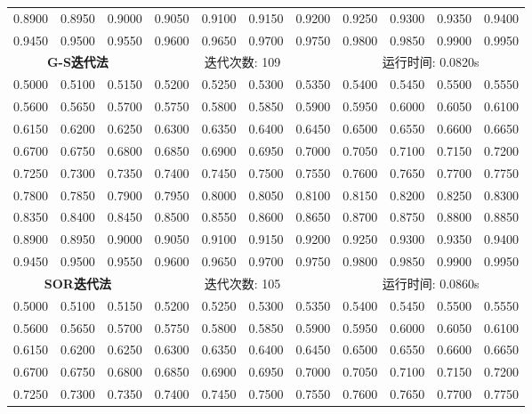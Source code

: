 \documentclass{article}
\begin{document}
\begin{table}[H]
\begin{tabular}{|*{11}{c}|}
		0.8900 & 0.8950 & 0.9000 & 0.9050 & 0.9100 & 0.9150 & 0.9200 & 0.9250 & 0.9300 & 0.9350 & 0.9400 \\
		0.9450 & 0.9500 & 0.9550 & 0.9600 & 0.9650 & 0.9700 & 0.9750 & 0.9800 & 0.9850 & 0.9900 & 0.9950 \\
		\hline
		\multicolumn{3}{|c}{\textbf{G-S迭代法}} & \multicolumn{4}{|c}{迭代次数: 109}\ & \multicolumn{4}{|c|}{运行时间: 0.0820s}\\
		\hline
		0.5000 & 0.5100 & 0.5150 & 0.5200 & 0.5250 & 0.5300 & 0.5350 & 0.5400 & 0.5450 & 0.5500 & 0.5550 \\
		0.5600 & 0.5650 & 0.5700 & 0.5750 & 0.5800 & 0.5850 & 0.5900 & 0.5950 & 0.6000 & 0.6050 & 0.6100 \\
		0.6150 & 0.6200 & 0.6250 & 0.6300 & 0.6350 & 0.6400 & 0.6450 & 0.6500 & 0.6550 & 0.6600 & 0.6650 \\
		0.6700 & 0.6750 & 0.6800 & 0.6850 & 0.6900 & 0.6950 & 0.7000 & 0.7050 & 0.7100 & 0.7150 & 0.7200 \\
		0.7250 & 0.7300 & 0.7350 & 0.7400 & 0.7450 & 0.7500 & 0.7550 & 0.7600 & 0.7650 & 0.7700 & 0.7750 \\
		0.7800 & 0.7850 & 0.7900 & 0.7950 & 0.8000 & 0.8050 & 0.8100 & 0.8150 & 0.8200 & 0.8250 & 0.8300 \\
		0.8350 & 0.8400 & 0.8450 & 0.8500 & 0.8550 & 0.8600 & 0.8650 & 0.8700 & 0.8750 & 0.8800 & 0.8850 \\
		0.8900 & 0.8950 & 0.9000 & 0.9050 & 0.9100 & 0.9150 & 0.9200 & 0.9250 & 0.9300 & 0.9350 & 0.9400 \\
		0.9450 & 0.9500 & 0.9550 & 0.9600 & 0.9650 & 0.9700 & 0.9750 & 0.9800 & 0.9850 & 0.9900 & 0.9950 \\
		\hline
		\multicolumn{3}{|c}{\textbf{SOR迭代法}} & \multicolumn{4}{|c}{迭代次数: 105}\ & \multicolumn{4}{|c|}{运行时间: 0.0860s}\\
		\hline
		0.5000 & 0.5100 & 0.5150 & 0.5200 & 0.5250 & 0.5300 & 0.5350 & 0.5400 & 0.5450 & 0.5500 & 0.5550 \\
		0.5600 & 0.5650 & 0.5700 & 0.5750 & 0.5800 & 0.5850 & 0.5900 & 0.5950 & 0.6000 & 0.6050 & 0.6100 \\
		0.6150 & 0.6200 & 0.6250 & 0.6300 & 0.6350 & 0.6400 & 0.6450 & 0.6500 & 0.6550 & 0.6600 & 0.6650 \\
		0.6700 & 0.6750 & 0.6800 & 0.6850 & 0.6900 & 0.6950 & 0.7000 & 0.7050 & 0.7100 & 0.7150 & 0.7200 \\
		0.7250 & 0.7300 & 0.7350 & 0.7400 & 0.7450 & 0.7500 & 0.7550 & 0.7600 & 0.7650 & 0.7700 & 0.7750 \\

\end{tabular}
\end{table}
\end{document}

